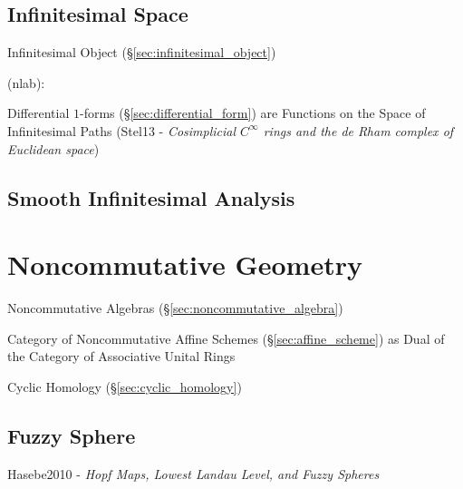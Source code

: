 \subsection{Infinitesimal Space}\label{sec:infinitesimal_space}

\fist Infinitesimal Object (\S\ref{sec:infinitesimal_object})

(nlab):

Differential $1$-forms (\S\ref{sec:differential_form}) are Functions on the
Space of Infinitesimal Paths (Stel13 - \emph{Cosimplicial $C^\infty$ rings and
  the de Rham complex of Euclidean space})



\subsection{Smooth Infinitesimal Analysis}
\label{sec:smooth_infinitesimal_analysis}



\section{Noncommutative Geometry}\label{sec:noncommutative_geometry}

Noncommutative Algebras (\S\ref{sec:noncommutative_algebra})

Category of Noncommutative Affine Schemes (\S\ref{sec:affine_scheme}) as Dual of
the Category of Associative Unital Rings

Cyclic Homology (\S\ref{sec:cyclic_homology})



\subsection{Fuzzy Sphere}\label{sec:fuzzy_sphere}

Hasebe2010 - \emph{Hopf Maps, Lowest Landau Level, and Fuzzy Spheres}
